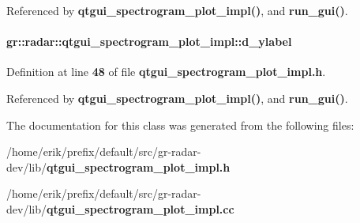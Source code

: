 Referenced by {\bf qtgui\+\_\+spectrogram\+\_\+plot\+\_\+impl()}, and {\bf run\+\_\+gui()}.

\paragraph[{d\+\_\+ylabel}]{ gr\+::radar\+::qtgui\+\_\+spectrogram\+\_\+plot\+\_\+impl\+::d\+\_\+ylabel}\label{classgr_1_1radar_1_1qtgui__spectrogram__plot__impl_aa9f12cd6e1a27907006f1ec0ce883c62}


Definition at line {\bf 48} of file {\bf qtgui\+\_\+spectrogram\+\_\+plot\+\_\+impl.\+h}.



Referenced by {\bf qtgui\+\_\+spectrogram\+\_\+plot\+\_\+impl()}, and {\bf run\+\_\+gui()}.



The documentation for this class was generated from the following files\+:\begin{DoxyCompactItemize}
\item 
/home/erik/prefix/default/src/gr-\/radar-\/dev/lib/{\bf qtgui\+\_\+spectrogram\+\_\+plot\+\_\+impl.\+h}\item 
/home/erik/prefix/default/src/gr-\/radar-\/dev/lib/{\bf qtgui\+\_\+spectrogram\+\_\+plot\+\_\+impl.\+cc}\end{DoxyCompactItemize}
